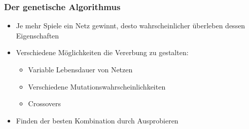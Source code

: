 \documentclass[compress]{beamer}
\begin{document}
\begin{frame}
	\frametitle{Der genetische Algorithmus}

	\begin{itemize}
		\item Je mehr Spiele ein Netz gewinnt, desto wahrscheinlicher überleben dessen Eigenschaften
		\item Verschiedene Möglichkeiten die Vererbung zu gestalten:

		\begin{itemize}
			\item Variable Lebensdauer von Netzen
			\item Verschiedene Mutationswahrscheinlichkeiten
			\item Crossovers
		\end{itemize}
		
		\item Finden der besten Kombination durch Ausprobieren
	\end{itemize}
\end{frame}
\end{document}
